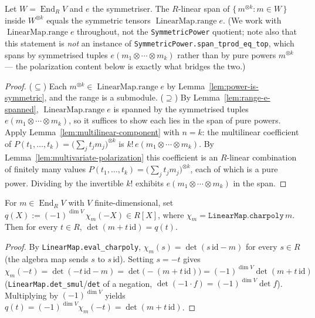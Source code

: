 \begin{lemma}
    \label{lem:powers-span-symmetric}
    Let $W = \operatorname{End}_R V$ and $e$ the symmetriser. The $R$-linear span of
    $\{\, m^{\otimes k} : m \in W \,\}$ inside $W^{\otimes k}$ equals the symmetric tensors
    $\operatorname{LinearMap.range} e$. (We work with $\operatorname{LinearMap.range} e$ throughout, not
    the \texttt{SymmetricPower} quotient; note also that this statement is \emph{not} an instance of
    \texttt{SymmetricPower.span\_tprod\_eq\_top}, which spans by symmetrised tuples
    $e(m_1 \otimes \cdots \otimes m_k)$ rather than by pure powers $m^{\otimes k}$ — the polarization
    content below is exactly what bridges the two.)
\end{lemma}
\begin{proof}
    ($\subseteq$) Each $m^{\otimes k} \in \operatorname{LinearMap.range} e$ by
    Lemma~\ref{lem:power-is-symmetric}, and the range is a submodule. ($\supseteq$) By
    Lemma~\ref{lem:range-e-spanned}, $\operatorname{LinearMap.range} e$ is spanned by the symmetrised tuples
    $e(m_1 \otimes \cdots \otimes m_k)$, so it suffices to show each lies in the span of pure powers. Apply
    Lemma~\ref{lem:multilinear-component} with $n = k$: the multilinear coefficient of
    $P(t_1, \ldots, t_k) = \bigl(\sum_j t_j m_j\bigr)^{\otimes k}$ is $k!\, e(m_1 \otimes \cdots \otimes m_k)$.
    By Lemma~\ref{lem:multivariate-polarization} this coefficient is an $R$-linear combination of finitely
    many values $P(t_1, \ldots, t_k) = \bigl(\sum_j t_j m_j\bigr)^{\otimes k}$, each of which is a pure
    power. Dividing by the invertible $k!$ exhibits $e(m_1 \otimes \cdots \otimes m_k)$ in the span.
\end{proof}

\begin{lemma}
    \label{lem:shifted-det-is-poly}
    For $m \in \operatorname{End}_R V$ with $V$ finite-dimensional, set $q(X) := (-1)^{\dim V}\,
    \chi_m(-X) \in R[X]$, where $\chi_m = \texttt{LinearMap.charpoly}\,m$. Then for every $t \in R$,
    $\det(m + t\,\mathrm{id}) = q(t)$.
\end{lemma}
\begin{proof}
    By \texttt{LinearMap.eval\_charpoly}, $\chi_m(s) = \det(s\,\mathrm{id} - m)$ for every $s \in R$
    (the algebra map sends $s$ to $s\,\mathrm{id}$). Setting $s = -t$ gives $\chi_m(-t) =
    \det(-t\,\mathrm{id} - m) = \det\bigl(-(m + t\,\mathrm{id})\bigr) = (-1)^{\dim V}\det(m + t\,\mathrm{id})$
    (\texttt{LinearMap.det\_smul}/\texttt{det} of a negation, $\det(-1 \cdot f) = (-1)^{\dim V}\det f$).
    Multiplying by $(-1)^{\dim V}$ yields $q(t) = (-1)^{\dim V}\chi_m(-t) = \det(m + t\,\mathrm{id})$.
\end{proof}

